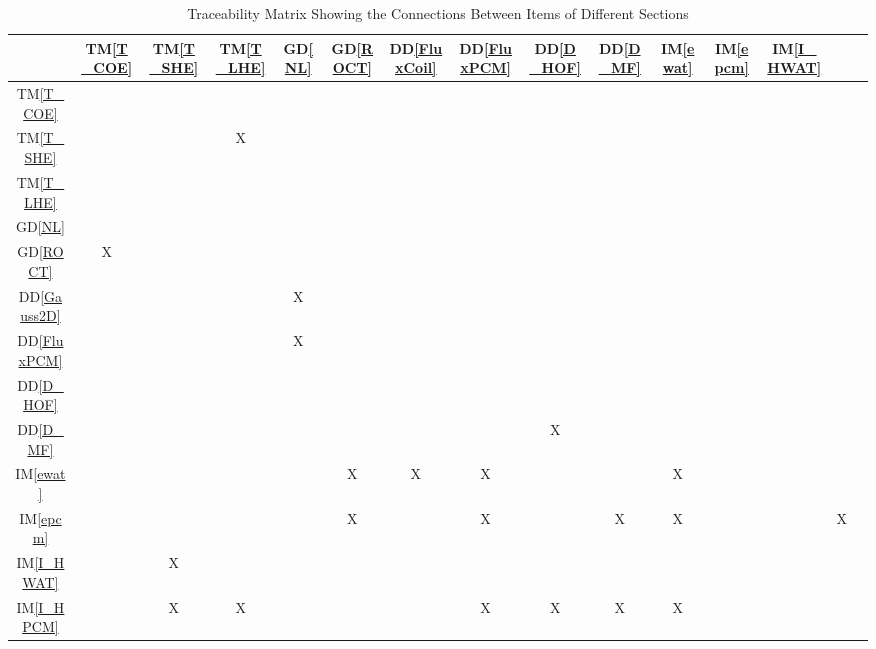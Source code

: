 \documentclass[12pt]{article}
\newcommand{\dref}[1]{GD\ref{#1}}
\newcommand{\ddref}[1]{DD\ref{#1}}
\newcommand{\tref}[1]{TM\ref{#1}}
\newcommand{\iref}[1]{IM\ref{#1}}
\begin{document}
\begin{table}[h!]
\centering
\begin{tabular}{|c|c|c|c|c|c|c|c|c|c|c|c|c|c|c|}
\hline        
	& \tref{T_COE}& \tref{T_SHE}& \tref{T_LHE}& \dref{NL}& \dref{ROCT} & \ddref{FluxCoil}& \ddref{FluxPCM} & \ddref{D_HOF}& \ddref{D_MF}& \iref{ewat}& \iref{epcm}& \iref{I_HWAT} \\
\hline
\tref{T_COE}     & & & & & & & & & & & & \\ \hline
\tref{T_SHE}     & & & X& & & & & & & & & \\ \hline
\tref{T_LHE}     & & & & & & & & & & & & \\ \hline
\dref{NL}        & & & & & & & & & & & & \\ \hline
\dref{ROCT}      & X& & & & & & & & & & & \\ \hline
\ddref{Gauss2D} & & & & X& & & & & & & & \\ \hline
\ddref{FluxPCM}  & & & & X& & & & & & & & \\ \hline
\ddref{D_HOF}    & & & & & & & & & & & & \\ \hline
\ddref{D_MF}     & & & & & & & & X& & & & \\ \hline
\iref{ewat}      & & & & & X& X& X& & & X& & \\ \hline
\iref{epcm}      & & & & & X& & X& & X& X& & & X \\ \hline
\iref{I_HWAT}    & & X& & & & & & & & & & \\ \hline
\iref{I_HPCM}    & & X& X& & & & X& X& X& X& & \\
\hline
\end{tabular}
\caption{Traceability Matrix Showing the Connections Between Items of Different Sections}
\label{Table:trace}
\end{table}
\end{document}
